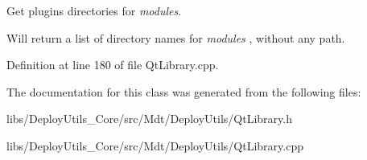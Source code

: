 Get plugins directories for {\itshape modules}. 

Will return a list of directory names for {\itshape modules} , without any path. 

Definition at line 180 of file Qt\+Library.\+cpp.



The documentation for this class was generated from the following files\+:\begin{DoxyCompactItemize}
\item 
libs/\+Deploy\+Utils\+\_\+\+Core/src/\+Mdt/\+Deploy\+Utils/Qt\+Library.\+h\item 
libs/\+Deploy\+Utils\+\_\+\+Core/src/\+Mdt/\+Deploy\+Utils/Qt\+Library.\+cpp\end{DoxyCompactItemize}
